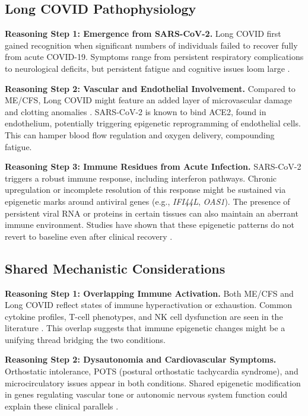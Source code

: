 \documentclass[journal]{IEEEtran}
\begin{document}
\subsection{Long COVID Pathophysiology}
\textbf{Reasoning Step 1: Emergence from SARS-CoV-2.}
Long COVID first gained recognition when significant numbers of individuals failed to recover fully from acute COVID-19. Symptoms range from persistent respiratory complications to neurological deficits, but persistent fatigue and cognitive issues loom large \cite{Davis2023longCOVID}.

\textbf{Reasoning Step 2: Vascular and Endothelial Involvement.}
Compared to ME/CFS, Long COVID might feature an added layer of microvascular damage and clotting anomalies \cite{Balnis2022persistent}. SARS-CoV-2 is known to bind ACE2, found in endothelium, potentially triggering epigenetic reprogramming of endothelial cells. This can hamper blood flow regulation and oxygen delivery, compounding fatigue.

\textbf{Reasoning Step 3: Immune Residues from Acute Infection.}
SARS-CoV-2 triggers a robust immune response, including interferon pathways. Chronic upregulation or incomplete resolution of this response might be sustained via epigenetic marks around antiviral genes (e.g., \textit{IFI44L}, \textit{OAS1}). The presence of persistent viral RNA or proteins in certain tissues can also maintain an aberrant immune environment. Studies have shown that these epigenetic patterns do not revert to baseline even after clinical recovery \cite{Bejaoui2023epigeneticAge}.

\subsection{Shared Mechanistic Considerations}
\textbf{Reasoning Step 1: Overlapping Immune Activation.}
Both ME/CFS and Long COVID reflect states of immune hyperactivation or exhaustion. Common cytokine profiles, T-cell phenotypes, and NK cell dysfunction are seen in the literature \cite{Balnis2022persistent,Helliwell2020changesDNA}. This overlap suggests that immune epigenetic changes might be a unifying thread bridging the two conditions.

\textbf{Reasoning Step 2: Dysautonomia and Cardiovascular Symptoms.}
Orthostatic intolerance, POTS (postural orthostatic tachycardia syndrome), and microcirculatory issues appear in both conditions. Shared epigenetic modification in genes regulating vascular tone or autonomic nervous system function could explain these clinical parallels \cite{Liu2016evaluation}.
\end{document}
